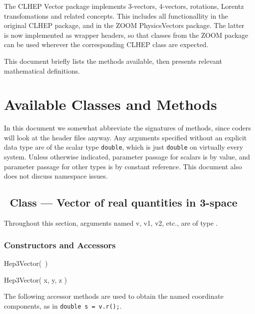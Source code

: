 \author{
Fermilab ``ZOOM'' Physics Class Library Task Force}
\date{Version 2.0, November 22, 2000}
\maketitle

The CLHEP Vector package implements 3-vectors, 4-vectors, rotations, 
Lorentz transfomations and related concepts.  
This includes all functionallity in the original CLHEP package, and in
the ZOOM PhysicsVectors package.  
The latter is now implemented as wrapper headers, so that classes from
the ZOOM package can be used wherever the corresponding CLHEP class are
expected.

This document briefly lists the methods available, then presents relevant
mathematical definitions. 

\tableofcontents

\section{Available Classes and Methods}

In this document we somewhat abbreviate the signatures of methods,
since coders will look at the header files anyway.  
Any arguments specified without an explicit data type
are of the scalar type {\tt double}, which is just {\tt double} on
virtually every system.
Unless otherwise indicated,
parameter passage for scalars is by value,
and parameter passage for other types is by constant reference.
This document also does not discuss namespace issues.

\subsection{\protect\SV\ Class --- Vector of real quantities in 3-space}

Throughout this section,
arguments named v, v1, v2, etc., are of type \SV .

\subsubsection{Constructors and Accessors}

\begin{shortlist}
  \item Hep3Vector(~)
  \item Hep3Vector( x, y, z ) 
\end{shortlist}

\noindent
The following accessor methods are used
to obtain the named coordinate components,
as in \verb|double s = v.r();|.

